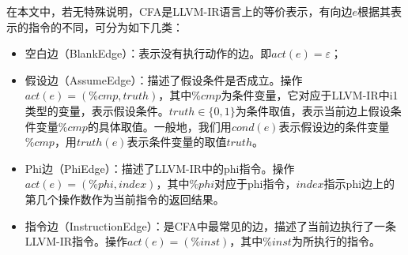 在本文中，若无特殊说明，CFA是LLVM-IR语言上的等价表示，有向边$ e $根据其表示的指令的不同，可分为如下几类：
\begin{itemize}
	\item 空白边（BlankEdge）：表示没有执行动作的边。即$ act(e) = \varepsilon $；
	
	\item 假设边（AssumeEdge）：描述了假设条件是否成立。操作$ act(e) = (\%cmp, truth) $，其中$ \%cmp $为条件变量，它对应于LLVM-IR中i1类型的变量，表示假设条件。$ truth \in \{0, 1\}$为条件取值，表示当前边上假设条件变量$ \%cmp $的具体取值。一般地，我们用$ cond(e) $表示假设边的条件变量$ \%cmp $，用$ truth(e) $表示条件变量的取值$ truth $。
	
	\item Phi边（PhiEdge）：描述了LLVM-IR中的phi指令。操作$ act(e) = (\%phi, index) $，其中$ \%phi $对应于phi指令，$ index $指示phi边上的第几个操作数作为当前指令的返回结果。
	
	\item 指令边（InstructionEdge）：是CFA中最常见的边，描述了当前边执行了一条LLVM-IR指令。操作$ act(e) = (\%inst) $，其中$ \%inst $为所执行的指令。
	

\end{itemize}

